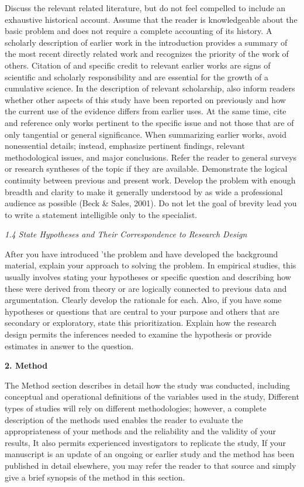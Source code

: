 \documentclass[twoside,10.5pt]{article}%
\begin{document}
Discuss the relevant related literature, but do not feel compelled to include an exhaustive historical account. Assume that the reader is knowledgeable about the basic problem and does not require a complete accounting of its history. A scholarly description of earlier work in the introduction provides a summary of the most recent directly related work and recognizes the priority of the work of others. Citation of and specific credit to relevant earlier works are signs of scientific and scholarly responsibility and are essential for the growth of a cumulative science. In the description of relevant scholarship, also inform readers whether other aspects of this study have been reported on previously and how the current use of the evidence differs from earlier uses. At the same time, cite and reference only works pertinent to the specific issue and not those that are of only tangential or general significance. When summarizing earlier works, avoid nonessential details; instead, emphasize pertinent findings, relevant methodological issues, and major conclusions. Refer the reader to general surveys or research syntheses of the topic if they are available. Demonstrate the logical continuity between previous and present work. Develop the problem with enough breadth and clarity to make it generally understood by as wide a professional audience as possible (Beck \& Sales, 2001). Do not let the goal of brevity lead you to write a statement intelligible only to the specialist.

\emph{1.4 State Hypotheses and Their Correspondence to Research Design}

After you have introduced 'the problem and have developed the background material, explain your approach to solving the problem. In empirical studies, this usually involves stating your hypotheses or specific question and describing how these were derived from theory or are logically connected to previous data and argumentation. Clearly develop the rationale for each. Also, if you have some hypotheses or questions that are central to your purpose and others that are secondary or exploratory, state this prioritization. Explain how the research design permits the inferences needed to examine the hypothesis or provide estimates in answer to the question.

\textbf{2. Method}

The Method section describes in detail how the study was conducted, including conceptual and operational definitions of the variables used in the study, Different types of studies will rely on different methodologies; however, a complete description of the methods used enables the reader to evaluate the appropriateness of your methods and the reliability and the validity of your results, It also permits experienced investigators to replicate the study, If your manuscript is an update of an ongoing or earlier study and the method has been published in detail elsewhere, you may refer the reader to that source and simply give a brief synopsis of the method in this section.
\end{document}
